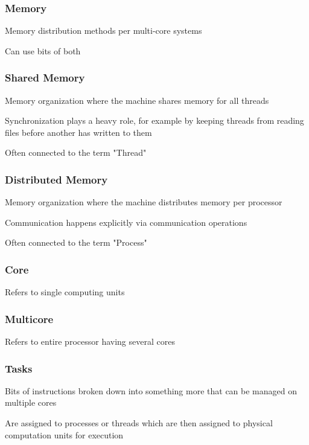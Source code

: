 \documentclass{article}
\begin{document}
\subsubsection{Memory}

Memory distribution methods per multi-core systems

Can use bits of both

\subsubsection{Shared Memory}

Memory organization where the machine shares memory for all threads

Synchronization plays a heavy role, for example by keeping threads from reading files before another has written to them

Often connected to the term "Thread"

\subsubsection{Distributed Memory}

Memory organization where the machine distributes memory per processor

Communication happens explicitly via communication operations

Often connected to the term "Process"

\subsubsection{Core}

Refers to single computing units

\subsubsection{Multicore}

Refers to entire processor having several cores

\subsubsection{Tasks}

Bits of instructions broken down into something more that can be managed on multiple cores

Are assigned to processes or threads which are then assigned to physical computation units for execution
\end{document}
